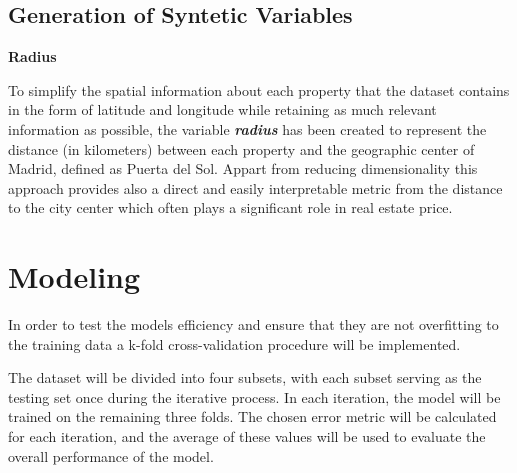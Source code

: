 \documentclass[11pt]{report} %
\begin{document}






\section{Generation of Syntetic Variables}

\textbf{Radius}

To simplify the spatial information about each property that the dataset contains in the form of latitude and longitude while retaining as much relevant information as possible, the variable \textit{\textbf{radius}} has been created to represent the distance (in kilometers) between each property and the geographic center of Madrid, defined as Puerta del Sol. 
Appart from reducing dimensionality this approach provides also a direct and easily interpretable metric from the distance to the city center which often plays a significant role in real estate price.

\chapter{Modeling}\label{chap:modelling}

In order to test the models efficiency and ensure that they are not overfitting to the training data a k-fold cross-validation procedure will be implemented.

The dataset will be divided into four subsets, with each subset serving as the testing set once during the iterative process. In each iteration, the model will be trained on the remaining three folds. The chosen error metric will be calculated for each iteration, and the average of these values will be used to evaluate the overall performance of the model.
\end{document}
